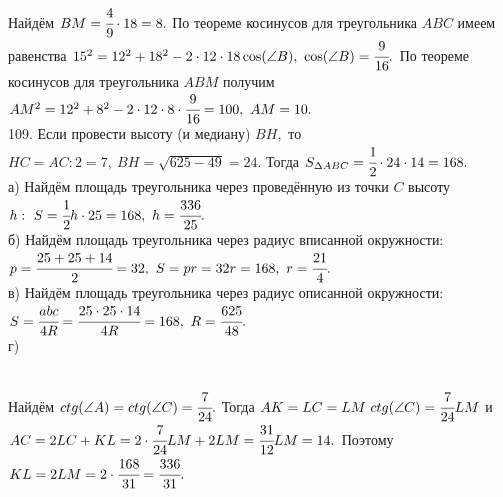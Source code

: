 \documentclass[12pt]{article}
\begin{document}
Найдём $BM=\cfrac{4}{9}\cdot18=8.$ По теореме косинусов для треугольника $ABC$ имеем равенства $15^2=12^2+18^2-2\cdot12\cdot18\cos(\angle B),\ \cos(\angle B)=\cfrac{9}{16}.$ По теореме косинусов для треугольника $ABM$ получим $AM^2=12^2+8^2-2\cdot12\cdot8\cdot\cfrac{9}{16}=100,\ AM=10.$\\
109. Если провести высоту (и медиану) $BH,$ то $HC=AC:2=7,\ BH=\sqrt{625-49}=24.$ Тогда $S_{\Delta ABC}=\cfrac{1}{2}\cdot24\cdot14=168.$\\
а) Найдём площадь треугольника через проведённую из точки $C$ высоту $h:\ S=\cfrac{1}{2}h\cdot25=168,\ h=\cfrac{336}{25}.$\\
б) Найдём площадь треугольника через радиус вписанной окружности: $p=\cfrac{25+25+14}{2}=32,\ S=pr=32r=168,\ r=\cfrac{21}{4}.$\\
в) Найдём площадь треугольника через радиус описанной окружности: $S=\cfrac{abc}{4R}=\cfrac{25\cdot25\cdot14}{4R}=168,\ R=\cfrac{625}{48}.$\\
г) \begin{figure}[ht!]
\end{figure}\\
Найдём $ctg(\angle A)=ctg(\angle C)=\cfrac{7}{24}.$ Тогда $AK=LC=LM\ ctg(\angle C)=\cfrac{7}{24}LM$ и $AC=2LC+KL=2\cdot\cfrac{7}{24}LM+2LM=\cfrac{31}{12}LM=14.$ Поэтому $KL=2LM=2\cdot\cfrac{168}{31}=\cfrac{336}{31}.$\\
\end{document}
